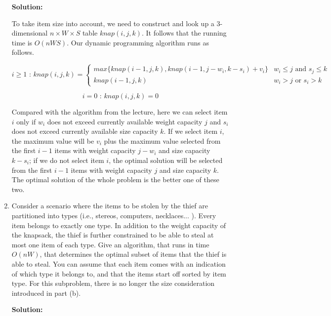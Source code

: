 \documentclass[11pt]{article}
\begin{document}
\begin{description}
\begin{enumerate}

\noindent \textbf{Solution:}

To take item size into account, we need to construct and look up a 3-dimensional $n \times W \times
S$ table $knap(i,j,k)$.  It follows that the running time is $O(nWS)$.  Our dynamic programming
algorithm runs as follows.

\[i\geq1 \textrm{  :  } knap(i,j,k)=\left\{\begin{array}{ll} max\{knap(i-1,j,k),knap(i-1,j-w_i,k-s_i)+v_i\} & w_i\leq j \textrm{ and } s_j\leq k\\

knap(i-1,j,k) & w_i>j \textrm{ or } s_i>k

\end{array}\right.\]

\[i=0 \textrm{  :  } knap(i,j,k)=0\]

Compared with the algorithm from the lecture, here we can select item $i$ only if $w_i$ does not
exceed currently available weight capacity $j$ and $s_i$ does not exceed currently available size
capacity $k$.  If we select item $i$, the maximum value will be $v_i$ plus the maximum value
selected from the first $i-1$ items with weight capacity $j-w_i$ and size capacity $k-s_i$;  if we
do not select item $i$, the optimal solution will be selected from the first $i-1$ items with
weight capacity $j$ and size capacity $k$.  The optimal solution of the whole problem is the better
one of these two.

\item Consider a scenario where the items to be stolen by the thief are partitioned into types
(i.e., stereos, computers, necklaces... ). Every item belongs to exactly one type. In addition to
the weight capacity of the knapsack, the thief is further constrained to be able to steal at most
one item of each type. Give an algorithm, that runs in time $O(nW)$, that determines the optimal
subset of items that the thief is able to steal. You can assume that each item comes with an
indication of which type it belongs to, and that the items start off sorted by item type. For this
subproblem, there is no longer the size consideration introduced in part (b).


 \noindent \textbf{Solution:}


\end{enumerate}
\end{description}
\end{document}
